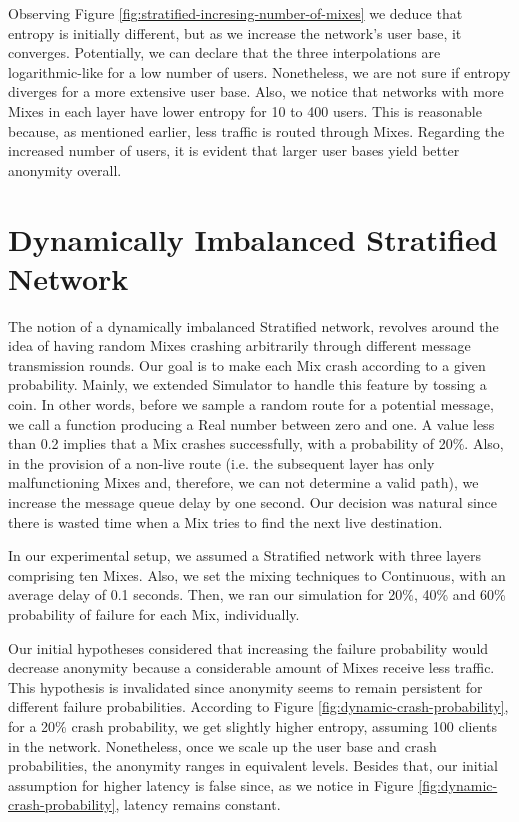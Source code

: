 \documentclass[logo,msc,cyber]{infthesis}   %
\begin{document}
Observing Figure \ref{fig:stratified-incresing-number-of-mixes} we
deduce that entropy is initially different, but as we increase the network's
user base, it converges. Potentially, we can declare that the three
interpolations are logarithmic-like for a low number of users. Nonetheless, we
are not sure if entropy diverges for a more extensive user base. Also, we notice
that networks with more Mixes in each layer have lower entropy for 10 to 400
users. This is reasonable because, as mentioned earlier, less traffic is routed
through Mixes. Regarding the increased number of users, it is evident that
larger user bases yield better anonymity overall.


\section{Dynamically Imbalanced Stratified Network}
The notion of a dynamically imbalanced Stratified network, revolves around the
idea of having random Mixes crashing arbitrarily through different message
transmission rounds. Our goal is to make each Mix crash according to a given
probability. Mainly, we extended Simulator to handle this feature by tossing a
coin. In other words, before we sample a random route for a potential message,
we call a function producing a Real number between zero and one. A value less than
0.2 implies that a Mix crashes successfully, with a probability of 20\%. Also,
in the provision of a non-live route (i.e. the subsequent layer has only
malfunctioning Mixes and, therefore, we can not determine a valid path), we
increase the message queue delay by one second. Our decision was natural since
there is wasted time when a Mix tries to find the next live destination.

In our experimental setup, we assumed a Stratified network with three layers
comprising ten Mixes. Also, we set the mixing techniques to Continuous, with an
average delay of 0.1 seconds. Then, we ran our simulation for 20\%, 40\% and 60\%
probability of failure for each Mix, individually. 

Our initial hypotheses considered that increasing the failure probability would
decrease anonymity because a considerable amount of Mixes receive less traffic.
This hypothesis is invalidated since anonymity seems to remain persistent for
different failure probabilities. According to Figure
\ref{fig:dynamic-crash-probability}, for a 20\% crash probability, we get
slightly higher entropy, assuming 100 clients in the network. Nonetheless, once
we scale up the user base and crash probabilities, the anonymity ranges in
equivalent levels. Besides that, our initial assumption for higher latency is
false since, as we notice in Figure \ref{fig:dynamic-crash-probability}, latency
remains constant. 
\end{document}
